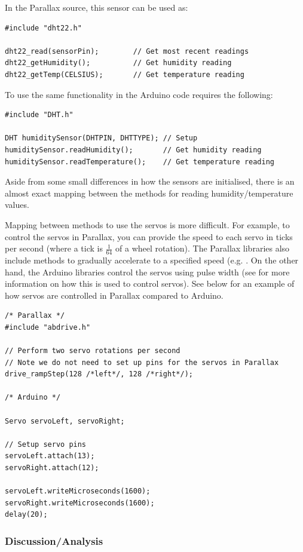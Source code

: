 \documentclass{UoYCSproject}
\begin{document}
In the Parallax source, this sensor can be used as:
\begin{verbatim}
#include "dht22.h"

dht22_read(sensorPin);        // Get most recent readings
dht22_getHumidity();          // Get humidity reading
dht22_getTemp(CELSIUS);       // Get temperature reading
\end{verbatim}

To use the same functionality in the Arduino code requires the following:
\begin{verbatim}
#include "DHT.h"

DHT humiditySensor(DHTPIN, DHTTYPE); // Setup
humiditySensor.readHumidity();       // Get humidity reading
humiditySensor.readTemperature();    // Get temperature reading
\end{verbatim}

Aside from some small differences in how the sensors are initialised, there is an almost exact mapping between the methods for reading humidity/temperature values. 

Mapping between methods to use the servos is more difficult. For example, to control the servos in Parallax, you can provide the speed to each servo in ticks per second (where a tick is $\frac{1}{64}$ of a wheel rotation). The Parallax libraries also include methods to gradually accelerate to a specified speed (e.g. . On the other hand, the Arduino libraries control the servos using pulse width (see \parencite{pulse_width} for more information on how this is used to control servos). See below for an example of how servos are controlled in Parallax compared to Arduino.
\begin{verbatim}
/* Parallax */
#include "abdrive.h"

// Perform two servo rotations per second
// Note we do not need to set up pins for the servos in Parallax
drive_rampStep(128 /*left*/, 128 /*right*/); 

/* Arduino */

Servo servoLeft, servoRight;

// Setup servo pins
servoLeft.attach(13);
servoRight.attach(12);

servoLeft.writeMicroseconds(1600);
servoRight.writeMicroseconds(1600);
delay(20); 
\end{verbatim}

\subsubsection{Discussion/Analysis}
\end{document}
